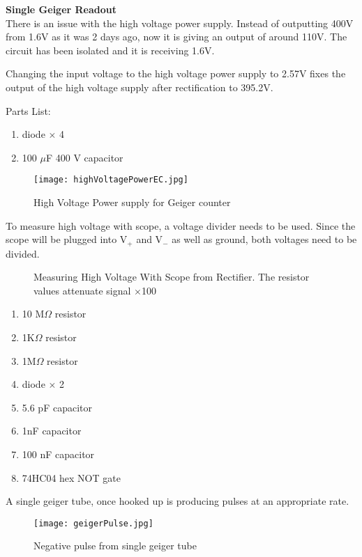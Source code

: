 \documentclass[oneside]{tufte-book}
\newenvironment{loggentry}[2]%
{\noindent\huge{\textbf{#2}}\normalsize\vspace{0.5cm}\marginnote{#1}\\}{\vspace{0.5cm}}
\begin{document}
  \begin{loggentry}{2018-Aug-30}{Single Geiger Readout}
    There is an issue with the high voltage power supply. Instead of outputting 400V from 1.6V as it was 2 days ago, now it is giving an output of around 110V. The circuit has been isolated and it is receiving 1.6V.

    Changing the input voltage to the high voltage power supply to 2.57V fixes the output of the high voltage supply after rectification to 395.2V.

    Parts List:
    \begin{enumerate}
      \item diode $\times$ 4
      \item 100 $\mu$F 400 V capacitor
    \end{enumerate}

    \begin{figure}
        \texttt{[image: highVoltagePowerEC.jpg]}
        \caption{High Voltage Power supply for Geiger counter}
        \label{powerSupplyReal}
    \end{figure}

    To measure high voltage with scope, a voltage divider needs to be used. Since the scope will be plugged into V$_+$ and V$_-$ as well as ground, both voltages need to be divided.

    \begin{figure}
        \centering
        
        \caption{Measuring High Voltage With Scope from Rectifier. The resistor values attenuate signal $\times$100}
        \label{scopeMeasurement}
    \end{figure}

    \begin{enumerate}
      \item 10 M$\Omega$ resistor
      \item 1K$\Omega$ resistor
      \item 1M$\Omega$ resistor
      \item diode $\times$ 2
      \item 5.6 pF capacitor
      \item 1nF capacitor
      \item 100 nF capacitor
      \item 74HC04 hex NOT gate
    \end{enumerate}

    A single geiger tube, once hooked up is producing pulses at an appropriate rate.

    \begin{figure}
        \centering
        \texttt{[image: geigerPulse.jpg]}
        \caption{Negative pulse from single geiger tube}
        \label{geigerScope}
    \end{figure}
  \end{loggentry}
\end{document}
